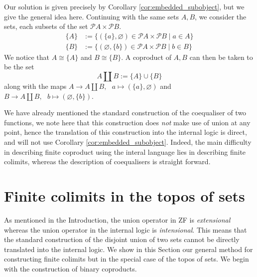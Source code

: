 \documentclass{tac}
\newcommand{\call}[1]{\mathcal{#1}}
\newcommand{\lto}{\longrightarrow}
\begin{document}
	Our solution is given precisely by Corollary \ref{cor:embedded_subobject}, but we give the general idea here. Continuing with the same sets $A,B$, we consider the sets, each subsets of the set $\call{P}A \times \call{P}B$.
	\begin{align}
		\lbrace A \rbrace &:= \big\lbrace (\lbrace a \rbrace,\varnothing) \in \call{P}A \times \call{P}B \mid a \in A \rbrace\\
		 \lbrace B \big\rbrace &:= \big\lbrace (\varnothing, \lbrace b \rbrace) \in \call{P}A \times \call{P}B \mid b \in B \big\rbrace
	\end{align}
	We notice that $A \cong \lbrace A \rbrace$ and $B \cong \lbrace B \rbrace$. A coproduct of $A,B$ can then be taken to be the set
	\begin{equation}
		A \coprod B := \lbrace A \rbrace \cup \lbrace B \rbrace
	\end{equation}
	along with the maps $A \lto A \coprod B,\text{ }a \longmapsto (\lbrace a \rbrace, \varnothing)$ and $B \lto A \coprod B,\text{ }b \longmapsto (\varnothing, \lbrace b \rbrace)$.
	
	We have already mentioned the standard construction of the coequaliser of two functions, we note here that this construction does \emph{not} make use of union at any point, hence the translation of this construction into the internal logic is direct, and will not use Corollary \ref{cor:embedded_subobject}. Indeed, the main difficulty in describing finite coproduct using the interal language lies in describing finite colimits, whereas the description of coequalisers is straight forward.
	
	\section{Finite colimits in the topos of sets}\label{sec:in_sets}
	As mentioned in the Introduction, the union operator in ZF is \emph{extensional} whereas the union operator in the internal logic is \emph{intensional}. This means that the standard construction of the disjoint union of two sets cannot be directly translated into the internal logic. We show in this Section our general method for constructing finite colimits but in the special case of the topos of sets. We begin with the construction of binary coproducts.
	
\end{document}
